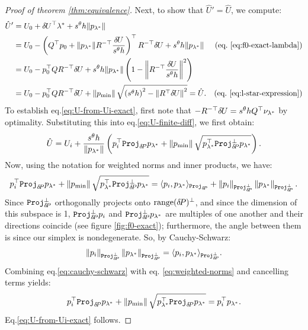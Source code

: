 \documentclass[smallcondensed]{svjour3}
\begin{document}
\begin{proof}[Proof of theorem \ref{thm:equivalence}]
  Next, to show that $\hat{U}' = \hat{U}$, we compute:
  \begin{align*}
    \hat{U}'
    &= U_0 + \delU^\top \lambda^* + s^\theta h \|p_{\lambda^*}\| & \\
    &= U_0 - \parens{Q^\top p_0 + \|p_{\lambda^*}\| R^{-\top} \frac{\delU}{s^\theta h}}^\top R^{-\top} \delU + s^\theta h \|p_{\lambda^*}\| & \mbox{(eq.\@ \ref{eq:f0-exact-lambda})} \\
    &= U_0 - p_0^\top Q R^{-\top} \delU + s^\theta h \|p_{\lambda^*}\| \parens{1 - \norm{R^{-\top} \frac{\delU}{s^\theta h}}^2} \\
    &= U_0 - p_0^\top Q R^{-\top} \delU + \norm{\pmin} \sqrt{\parens{s^\theta h}^2 - \norm{R^\top \delU}^2} = \hat{U}. & \mbox{(eq.\@ \ref{eq:l-star-expression})}
  \end{align*}
  To establish eq.\@ \ref{eq:U-from-Ui-exact}, first note that
  $-R^{-\top} {\delta \hspace{-0.09em} U} = s^\theta h Q^\top \nu_{\lambda^*}$ by
  optimality. Substituting this into eq.\@ \ref{eq:U-finite-diff},
  we first obtain:
  \begin{equation}
    \hat{U} = U_i + \frac{s^\theta h}{\|p_{\lambda^*}\|} \left(p_i^\top \mathtt{Proj}_{{\delta \hspace{-0.14em} P}} p_{\lambda^*} + \left\|p_{\operatorname{min}}\right\| \sqrt{p_{\lambda^*}^\top \mathtt{Proj}^\perp_{{\delta \hspace{-0.14em} P}} p_{\lambda^*}}\right).
  \end{equation}
  Now, using the notation for weighted norms and inner products, we have:
  \begin{equation}\label{eq:weighted-norms}
    p_i^\top \mathtt{Proj}_{{\delta \hspace{-0.14em} P}} p_{\lambda^*} + \left\|p_{\operatorname{min}}\right\| \sqrt{p_{\lambda^*}^\top \mathtt{Proj}^\perp_{{\delta \hspace{-0.14em} P}} p_{\lambda^*}} = \langle p_i, p_{\lambda^*} \rangle_{\mathtt{Proj}_{{\delta \hspace{-0.14em} P}}} + \left\|p_i\right\|_{\mathtt{Proj}^\perp_{{\delta \hspace{-0.14em} P}}} \left\|p_{\lambda^*}\right\|_{\mathtt{Proj}^\perp_{{\delta \hspace{-0.14em} P}}}.
  \end{equation}
  Since $\mathtt{Proj}^\perp_{{\delta \hspace{-0.14em} P}}$ orthogonally projects onto
  $\operatorname{range}({\delta \hspace{-0.14em} P})^\perp$, and since the dimension of this subspace is
  1, $\mathtt{Proj}^\perp_{{\delta \hspace{-0.14em} P}} p_i$ and
  $\mathtt{Proj}^\perp_{{\delta \hspace{-0.14em} P}} p_{\lambda^*}$ are multiples of one
  another and their directions coincide (see figure
  \ref{fig:f0-exact}); furthermore, the angle between them is since
  our simplex is nondegenerate. So, by Cauchy-Schwarz:
  \begin{equation}\label{eq:cauchy-schwarz}
    \left\|p_i\right\|_{\mathtt{Proj}^\perp_{{\delta \hspace{-0.14em} P}}} \left\|p_{\lambda^*}\right\|_{\mathtt{Proj}^\perp_{{\delta \hspace{-0.14em} P}}} = \langle p_i, p_{\lambda^*} \rangle_{\mathtt{Proj}^\perp_{{\delta \hspace{-0.14em} P}}}.
  \end{equation}
  Combining eq.\@ \ref{eq:cauchy-schwarz} with eq.\@
  \ref{eq:weighted-norms} and cancelling terms yields:
  \begin{equation}
    p_i^\top \mathtt{Proj}_{{\delta \hspace{-0.14em} P}} p_{\lambda^*} + \left\|p_{\operatorname{min}}\right\| \sqrt{p_{\lambda^*}^\top \mathtt{Proj}_{{\delta \hspace{-0.14em} P}} p_{\lambda^*}} = p_i^\top p_{\lambda^*}.
  \end{equation}
  Eq.\@ \ref{eq:U-from-Ui-exact} follows.


\end{proof}
\end{document}
